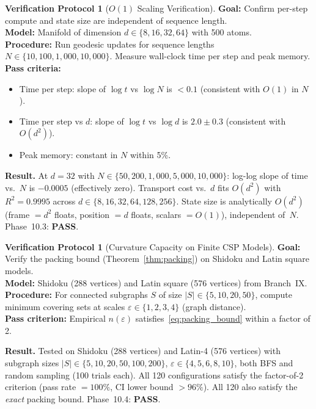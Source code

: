 \documentclass[11pt,a4paper]{article}
\theoremstyle{definition}
\newtheorem{protocol}[theorem]{Verification Protocol}
\theoremstyle{remark}
\begin{document}
\begin{protocol}[$O(1)$ Scaling Verification]\label{prot:o1_scaling}
\textbf{Goal:} Confirm per-step compute and state size are 
independent of sequence length. \\
\textbf{Model:} Manifold of dimension $d \in \{8, 16, 32, 64\}$ 
with 500 atoms. \\
\textbf{Procedure:} Run geodesic updates for sequence lengths 
$N \in \{10, 100, 1{,}000, 10{,}000\}$. Measure wall-clock time 
per step and peak memory. \\
\textbf{Pass criteria:}
\begin{itemize}[nosep]
    \item Time per step: slope of $\log t$ vs $\log N$ is 
    $< 0.1$ (consistent with $O(1)$ in $N$).
    \item Time per step vs $d$: slope of $\log t$ vs $\log d$ is 
    $2.0 \pm 0.3$ (consistent with $O(d^2)$).
    \item Peak memory: constant in $N$ within 5\%.
\end{itemize}

\textbf{Result.} At $d = 32$ with $N \in \{50, 200,
1{,}000, 5{,}000, 10{,}000\}$: log-log slope of time 
vs.~$N$ is $-0.0005$ (effectively zero). Transport cost 
vs.~$d$ fits $O(d^2)$ with $R^2 = 0.9995$ across 
$d \in \{8, 16, 32, 64, 128, 256\}$. State size is 
analytically $O(d^2)$ (frame $= d^2$ floats, 
position $= d$ floats, scalars $= O(1)$), independent 
of~$N$. Phase~10.3: \textbf{PASS}.
\end{protocol}

\begin{protocol}[Curvature Capacity on Finite CSP Models]%
\label{prot:csp_capacity}
\textbf{Goal:} Verify the packing bound (Theorem~\ref{thm:packing}) 
on Shidoku and Latin square models. \\
\textbf{Model:} Shidoku (288 vertices) and Latin square 
(576 vertices) from Branch~IX. \\
\textbf{Procedure:} For connected subgraphs $S$ of size 
$|S| \in \{5, 10, 20, 50\}$, compute minimum covering sets 
at scales $\varepsilon \in \{1, 2, 3, 4\}$ (graph distance). \\
\textbf{Pass criterion:} Empirical $n(\varepsilon)$ 
satisfies~\eqref{eq:packing_bound} within a factor of 2.

\textbf{Result.} Tested on Shidoku (288 vertices) and 
Latin-4 (576 vertices) with subgraph sizes 
$|S| \in \{5, 10, 20, 50, 100, 200\}$, 
$\varepsilon \in \{4, 5, 6, 8, 10\}$, both BFS and 
random sampling (100 trials each). All 120 
configurations satisfy the factor-of-2 criterion 
(pass rate $= 100\%$, CI lower bound $> 96\%$). 
All 120 also satisfy the \emph{exact} packing bound. 
Phase~10.4: \textbf{PASS}.
\end{protocol}
\end{document}
